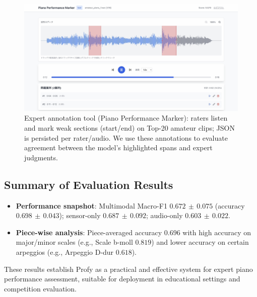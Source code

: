 \documentclass[sigconf,review,anonymous]{acmart}
\begin{document}
\begin{figure}[t]
  \centering
  \includegraphics[width=0.95\linewidth]{figures/piano_marker.png}
  \caption{Expert annotation tool (Piano Performance Marker): raters listen and mark weak sections (start/end) on Top-20 amateur clips; JSON is persisted per rater/audio. We use these annotations to evaluate agreement between the model's highlighted spans and expert judgments.}
  \label{fig:annotation_ui}
\end{figure}

\subsection{Summary of Evaluation Results}
\begin{itemize}
\item \textbf{Performance snapshot}: Multimodal Macro-F1 $0.672\,\pm\,0.075$ (accuracy $0.698\,\pm\,0.043$); sensor-only $0.687\,\pm\,0.092$; audio-only $0.603\,\pm\,0.022$.
\item \textbf{Piece-wise analysis}: Piece-averaged accuracy $0.696$ with high accuracy on major/minor scales (e.g., Scale b-moll $0.819$) and lower accuracy on certain arpeggios (e.g., Arpeggio D-dur $0.618$).
\end{itemize}

These results establish Profy as a practical and effective system for expert piano performance assessment, suitable for deployment in educational settings and competition evaluation.
\end{document}
